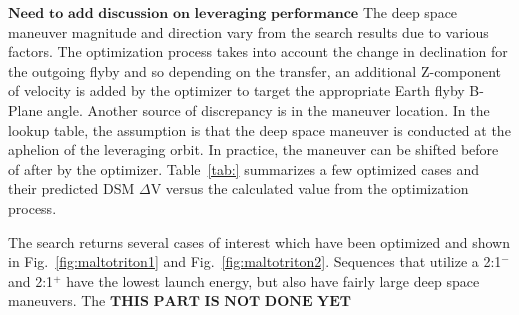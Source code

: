 \documentclass[letterpaper, preprint, paper,11pt]{AAS}	%
\begin{document}
$\textbf{Need to add discussion on leveraging performance}$
The deep space maneuver magnitude and direction vary from the search results due to various factors. The optimization process takes into account the change in declination for the outgoing flyby and so depending on the transfer, an additional Z-component of velocity is added by the optimizer to target the appropriate Earth flyby B-Plane angle. Another source of discrepancy is in the maneuver location. In the lookup table, the assumption is that the deep space maneuver is conducted at the aphelion of the leveraging orbit. In practice, the maneuver can be shifted before of after by the optimizer. Table~\ref{tab:} summarizes a few optimized cases and their predicted DSM $\Delta$V versus the calculated value from the optimization process.

The search returns several cases of interest which have been optimized and shown in Fig.~\ref{fig:maltotriton1} and Fig.~\ref{fig:maltotriton2}. Sequences that utilize a 2:1$^{-}$ and 2:1$^{+}$ have the lowest launch energy, but also have fairly large deep space maneuvers. The
$\textbf{THIS PART IS NOT DONE YET}$

\appendix
\clearpage
\end{document}
